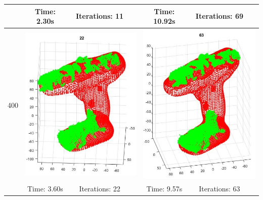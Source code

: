 \documentclass[letterpaper, 10 pt, conference]{ieeeconf}  %
\begin{document}
\begin{table}
\begin{tabular}{ccccccc}
 & Time: 2.30s & Iterations: 11 &  & Time: 10.92s & Iterations: 69 & \\ 
\midrule
400 & \multicolumn{3}{c}{\includegraphics[scale=0.43]{d400p.jpg}} & \multicolumn{3}{c}{\includegraphics[scale=0.43]{d400o.jpg}}\\ 
 & Time: 3.60s& Iterations: 22 &  & Time: 9.57s& Iterations: 63& \\ 
\bottomrule
\end{tabular} 
\end{table}
\end{document}
